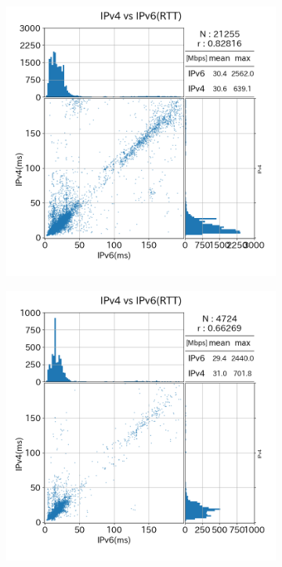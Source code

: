 \begin{figure}[htbp]
    \begin{center}
        \begin{subfigure}[b]{0.49\textwidth}
            \centering
            \includegraphics[width=1.0\textwidth]{fig/old_sameISP_rtt.png}
            \label{old_sameISP_rtt}
        \end{subfigure}
        \begin{subfigure}[b]{0.49\textwidth}
            \centering
            \includegraphics[width=1.0\textwidth]{fig/old_diffISP_rtt.png}

\end{subfigure}
\end{center}
\end{figure}
